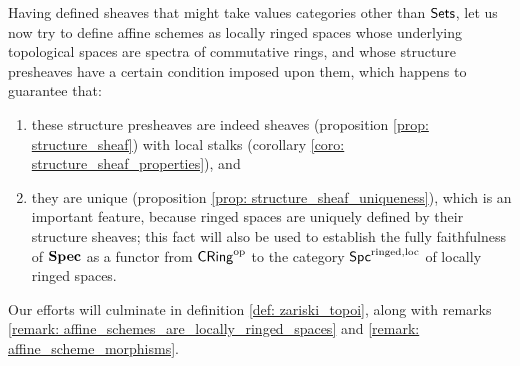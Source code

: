                 Having defined sheaves that might take values categories other than $\mathsf{Sets}$, let us now try to define affine schemes as locally ringed spaces whose underlying topological spaces are spectra of commutative rings, and whose structure presheaves have a certain condition imposed upon them, which happens to guarantee that:
                    \begin{enumerate}
                        \item these structure presheaves are indeed sheaves (proposition \ref{prop: structure_sheaf}) with local stalks (corollary \ref{coro: structure_sheaf_properties}), and
                        \item they are unique (proposition \ref{prop: structure_sheaf_uniqueness}), which is an important feature, because ringed spaces are uniquely defined by their structure sheaves; this fact will also be used to establish the fully faithfulness of $\mathbf{Spec}$ as a functor from $\mathsf{CRing}^{\mathrm{op}}$ to the category $\mathsf{Spc}^{\mathrm{ringed}, \mathrm{loc}}$ of locally ringed spaces. 
                    \end{enumerate}
                Our efforts will culminate in definition \ref{def: zariski_topoi}, along with remarks \ref{remark: affine_schemes_are_locally_ringed_spaces} and \ref{remark: affine_scheme_morphisms}. 
                    
